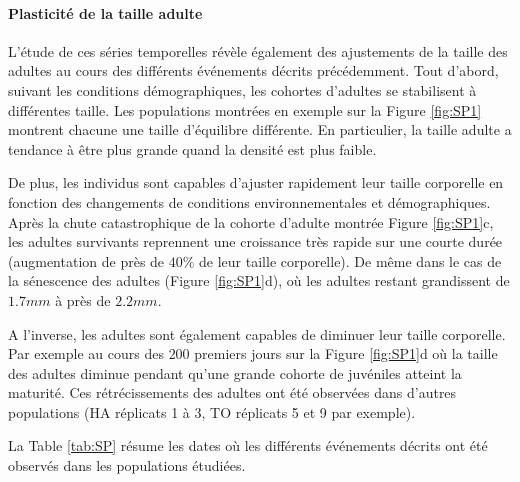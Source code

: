 \paragraph{Plasticité de la taille adulte}

L'étude de ces séries temporelles révèle également des ajustements de la taille
des adultes au cours des différents événements décrits précédemment. Tout
d'abord, suivant les conditions démographiques, les cohortes d'adultes se
stabilisent à différentes taille. Les populations montrées en exemple sur la
Figure \ref{fig:SP1} montrent chacune une taille d'équilibre différente. En
particulier, la taille adulte a tendance à être plus grande quand la densité est
plus faible. 

De plus, les individus sont capables d'ajuster rapidement leur taille corporelle
en fonction des changements de conditions environnementales et démographiques.
Après la chute catastrophique de la cohorte d'adulte montrée Figure
\ref{fig:SP1}c, les adultes survivants reprennent une croissance très rapide sur
une courte durée (augmentation de près de $40\%$ de leur taille corporelle). De
même dans le cas de la sénescence des adultes (Figure \ref{fig:SP1}d), où les
adultes restant grandissent de $1.7mm$ à près de $2.2mm$.

A l'inverse, les adultes sont également capables de diminuer leur taille
corporelle. Par exemple au cours des $200$ premiers jours sur la Figure
\ref{fig:SP1}d où la taille des adultes diminue pendant qu'une grande cohorte de
juvéniles atteint la maturité. Ces rétrécissements des adultes ont été observées
dans d'autres populations (HA réplicats 1 à 3, TO réplicats 5 et 9 par exemple).

La Table \ref{tab:SP} résume les dates où les différents événements décrits ont
été observés dans les populations étudiées. 

